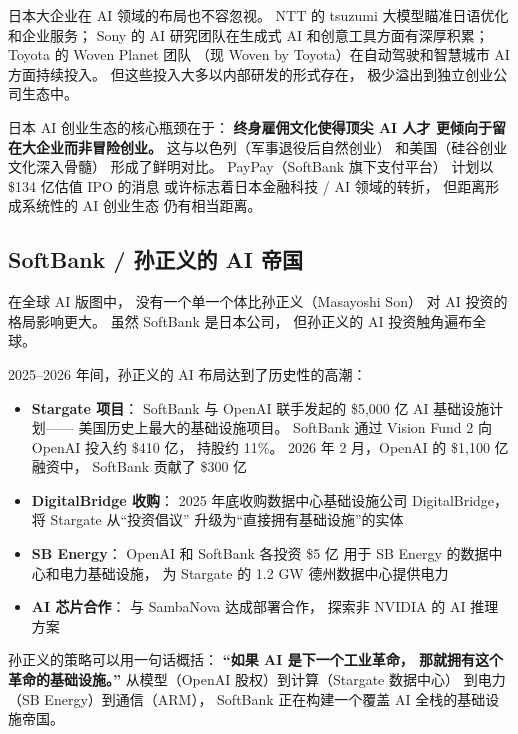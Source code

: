 日本大企业在 AI 领域的布局也不容忽视。
NTT 的 tsuzumi 大模型瞄准日语优化和企业服务；
Sony 的 AI 研究团队在生成式 AI 和创意工具方面有深厚积累；
Toyota 的 Woven Planet 团队
（现 Woven by Toyota）在自动驾驶和智慧城市 AI 方面持续投入。
但这些投入大多以内部研发的形式存在，
极少溢出到独立创业公司生态中。

日本 AI 创业生态的核心瓶颈在于：
\textbf{终身雇佣文化使得顶尖 AI 人才
更倾向于留在大企业而非冒险创业。}
这与以色列（军事退役后自然创业）
和美国（硅谷创业文化深入骨髓）
形成了鲜明对比。
PayPay（SoftBank 旗下支付平台）
计划以 \$134 亿估值 IPO 的消息
或许标志着日本金融科技 / AI 领域的转折，
但距离形成系统性的 AI 创业生态
仍有相当距离。

\subsection{SoftBank / 孙正义的 AI 帝国}

在全球 AI 版图中，
没有一个单一个体比孙正义（Masayoshi Son）
对 AI 投资的格局影响更大。
虽然 SoftBank 是日本公司，
但孙正义的 AI 投资触角遍布全球。

2025--2026 年间，孙正义的 AI 布局达到了历史性的高潮：

\begin{itemize}[noitemsep]
  \item \textbf{Stargate 项目}：
        SoftBank 与 OpenAI 联手发起的
        \$5,000 亿 AI 基础设施计划——
        美国历史上最大的基础设施项目。
        SoftBank 通过 Vision Fund 2
        向 OpenAI 投入约 \$410 亿，
        持股约 11\%。
        2026 年 2 月，OpenAI 的 \$1,100 亿融资中，
        SoftBank 贡献了 \$300 亿
  \item \textbf{DigitalBridge 收购}：
        2025 年底收购数据中心基础设施公司 DigitalBridge，
        将 Stargate 从``投资倡议''
        升级为``直接拥有基础设施''的实体
  \item \textbf{SB Energy}：
        OpenAI 和 SoftBank 各投资 \$5 亿
        用于 SB Energy 的数据中心和电力基础设施，
        为 Stargate 的 1.2 GW 德州数据中心提供电力
  \item \textbf{AI 芯片合作}：
        与 SambaNova 达成部署合作，
        探索非 NVIDIA 的 AI 推理方案
\end{itemize}

孙正义的策略可以用一句话概括：
\textbf{``如果 AI 是下一个工业革命，
那就拥有这个革命的基础设施。''}
从模型（OpenAI 股权）到计算（Stargate 数据中心）
到电力（SB Energy）到通信（ARM），
SoftBank 正在构建一个覆盖 AI 全栈的基础设施帝国。

